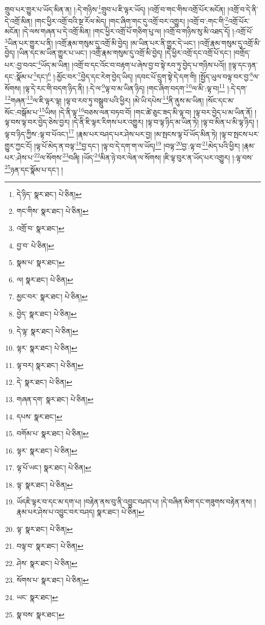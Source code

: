 གྲུབ་པར་གྱུར་པ་ཡོད་མིན་ན། །:དེ་གཉིས་\footnote{དེ་ཉིད་  སྣར་ཐང་།  པེ་ཅིན། }གྲུབ་པ་ཇི་ལྟར་ཡོད། །འགྲོ་བ་གང་གིས་འགྲོ་པོར་མངོན། །འགྲོ་བ་དེ་ནི་དེ་འགྲོ་མིན། །གང་ཕྱིར་འགྲོ་བའི་སྔ་རོལ་མེད། །གང་ཞིག་གང་དུ་འགྲོ་བར་འགྱུར། །འགྲོ་བ་:གང་གི་\footnote{གང་གིས་  སྣར་ཐང་།  པེ་ཅིན། }འགྲོ་པོར་མངོན། །དེ་ལས་གཞན་པ་དེ་འགྲོ་མིན། །གང་ཕྱིར་འགྲོ་པོ་གཅིག་པུ་ལ། །འགྲོ་བ་གཉིས་སུ་མི་འཐད་དོ། །:འགྲོ་པོ་\footnote{འགྲོ་བ་  སྣར་ཐང་། }ཡིན་པར་གྱུར་པ་ནི། །འགྲོ་རྣམ་གསུམ་དུ་འགྲོ་མི་བྱེད། །མ་ཡིན་པར་ནི་གྱུར་དེ་ཡང་། །འགྲོ་རྣམ་གསུམ་དུ་འགྲོ་མི་བྱེད། །ཡིན་དང་མ་ཡིན་གྱུར་པ་ཡང་། །འགྲོ་རྣམ་གསུམ་དུ་འགྲོ་མི་བྱེད། །དེ་ཕྱིར་འགྲོ་དང་འགྲོ་པོ་དང་། །བགྲོད་པར་:བྱ་བའང་\footnote{བྱ་བ་  པེ་ཅིན། }ཡོད་མ་ཡིན། །འགྲོ་བ་དང་འོང་བ་བརྟག་པ་ཞེས་བྱ་བ་སྟེ་རབ་ཏུ་བྱེད་པ་གཉིས་པའོ།། །།ལྟ་དང་ཉན་དང་:སྣོམ་པ་\footnote{སྣམ་པ་  སྣར་ཐང་། }དང་།\footnote{ལ།  སྣར་ཐང་།  པེ་ཅིན། } །:མྱོང་བར་\footnote{མྱང་བར་  སྣར་ཐང་།  པེ་ཅིན། }བྱེད་དང་རེག་བྱེད་ཡིད། །དབང་པོ་དྲུག་སྟེ་དེ་དག་གི། །སྤྱོད་ཡུལ་བལྟ་བར་བྱ་\footnote{བྱེད་  སྣར་ཐང་།  པེ་ཅིན། }ལ་སོགས། །ལྟ་དེ་རང་གི་བདག་ཉིད་ནི། །:དེ་ལ་\footnote{དེ་ལྟ་  སྣར་ཐང་།  པེ་ཅིན། }ལྟ་བ་མ་ཡིན་ཉིད། །གང་ཞིག་བདག་\footnote{ལྟར་  སྣར་ཐང་།  པེ་ཅིན། }ལ་མི་:ལྟ་བ།\footnote{ལྟ་བར།  སྣར་ཐང་།  པེ་ཅིན། } །:དེ་དག་\footnote{དེ་  སྣར་ཐང་།  པེ་ཅིན། }གཞན་\footnote{གཞན་དག་  སྣར་ཐང་།  པེ་ཅིན། }ལ་ཇི་ལྟར་ལྟ། །ལྟ་བ་རབ་ཏུ་བསྒྲུབ་པའི་ཕྱིར། །མེ་ཡི་དཔེས་\footnote{དཔས་  སྣར་ཐང་། }ནི་ནུས་མ་ཡིན། །སོང་དང་མ་སོང་:བསྒོམ་པ་\footnote{བགོམ་པ་  སྣར་ཐང་།  པེ་ཅིན། }ཡིས། །དེ་ནི་ལྟ་\footnote{ལྟར་  སྣར་ཐང་།  པེ་ཅིན། }བཅས་ལན་བཏབ་བོ། །གང་ཚེ་ཅུང་ཟད་མི་ལྟ་བ། །ལྟ་བར་བྱེད་པ་མ་ཡིན་ནོ། །ལྟ་བས་ལྟ་བར་བྱེད་ཅེས་བྱར། །དེ་ནི་ཇི་ལྟར་རིགས་པར་འགྱུར། །ལྟ་བ་ལྟ་ཉིད་མ་ཡིན་ཏེ། །ལྟ་བ་མིན་པ་མི་ལྟ་ཉིད། །ལྟ་བ་ཉིད་ཀྱིས་:ལྟ་བ་པོའང་།\footnote{ལྟ་པོ་ཡང་།  སྣར་ཐང་།  པེ་ཅིན། } །རྣམ་པར་བཤད་པར་ཤེས་པར་བྱ། །མ་སྤངས་ལྟ་པོ་ཡོད་མིན་ཏེ། །ལྟ་བ་སྤངས་པར་གྱུར་ཀྱང་ངོ། །ལྟ་པོ་མེད་ན་བལྟ་\footnote{ལྟ་  སྣར་ཐང་།  པེ་ཅིན། }བྱ་དང་། །ལྟ་བ་དེ་དག་ག་ལ་ཡོད།\footnote{ཡོདཇི་ལྟར་བ་དང་མ་དག་པ། །བརྟེན་ནས་བུ་ནི་འབྱུང་བཤད་པ། །དེ་བཞིན་མིག་དང་གཟུགས་བརྟེན་ནས། །རྣམ་པར་ཤེས་པ་འབྱུང་བར་བཤད།  སྣར་ཐང་།  པེ་ཅིན། } །བལྟ་\footnote{ལྟ་  སྣར་ཐང་།  པེ་ཅིན། }བྱ་:ལྟ་བ་\footnote{བལྟ་བ་  སྣར་ཐང་།  པེ་ཅིན། }མེད་པའི་ཕྱིར། །རྣམ་པར་:ཤེས་པ་\footnote{ཤེས་  སྣར་ཐང་།  པེ་ཅིན། }ལ་སོགས་\footnote{སོགས་པ་  སྣར་ཐང་།  པེ་ཅིན། }བཞི། །ཡོད་\footnote{ཡང་  སྣར་ཐང་། }མིན་ཉེ་བར་ལེན་ལ་སོགས། །ཇི་ལྟ་བུར་ན་ཡོད་པར་འགྱུར། །:ལྟ་བས་\footnote{སྣ་བས་  སྣར་ཐང་། }ཉན་དང་སྣོམ་པ་དང་། །
